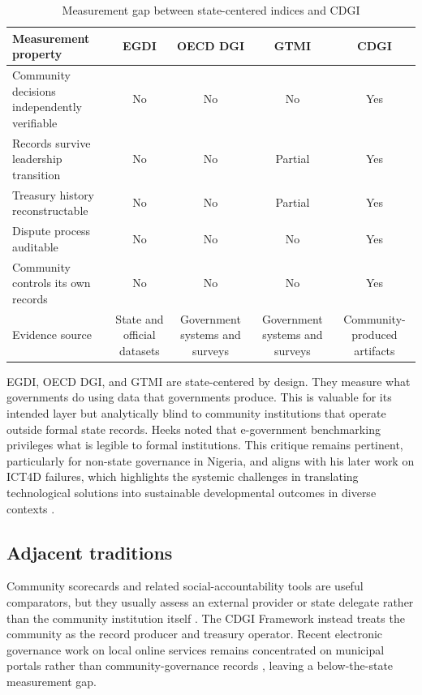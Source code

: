 \documentclass[review,onecolumn]{elsarticle}
\begin{document}
\begin{table}[t]
\caption{Measurement gap between state-centered indices and CDGI}
\label{tab:gap}
\small
\begin{tabularx}{\textwidth}{Ycccc}
\toprule
Measurement property & EGDI & OECD DGI & GTMI & CDGI \\
\midrule
Community decisions independently verifiable & No & No & No & Yes \\
Records survive leadership transition & No & No & Partial & Yes \\
Treasury history reconstructable & No & No & Partial & Yes \\
Dispute process auditable & No & No & No & Yes \\
Community controls its own records & No & No & No & Yes \\
Evidence source & State and official datasets & Government systems and surveys & Government systems and surveys & Community-produced artifacts \\
\bottomrule
\end{tabularx}
\end{table}


EGDI, OECD DGI, and GTMI are state-centered by design. They measure what governments do using data that governments produce. This is valuable for its intended layer but analytically blind to community institutions that operate outside formal state records. Heeks \cite{heeks2006} noted that e-government benchmarking privileges what is legible to formal institutions. This critique remains pertinent, particularly for non-state governance in Nigeria, and aligns with his later work on ICT4D failures, which highlights the systemic challenges in translating technological solutions into sustainable developmental outcomes in diverse contexts \cite{heeks2002, heeks2003}.

\subsection{Adjacent traditions}

Community scorecards and related social-accountability tools are useful comparators, but they usually assess an external provider or state delegate rather than the community institution itself \cite{cooke2001,bjorkman2009}. The CDGI Framework instead treats the community as the record producer and treasury operator. Recent electronic governance work on local online services remains concentrated on municipal portals rather than community-governance records \cite{gasco2017,janowski2015}, leaving a below-the-state measurement gap.
\end{document}
